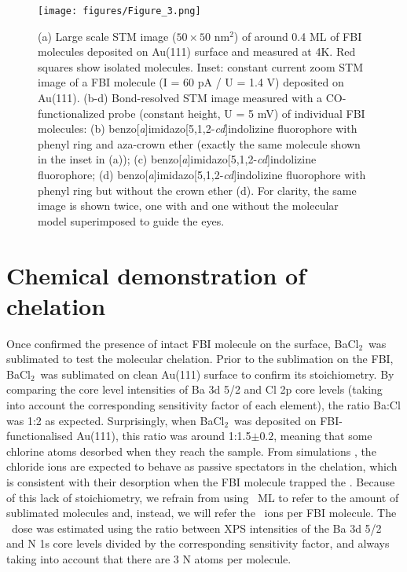 \documentclass[aps,prl,reprint,longbibliography,superscriptaddress, english]{revtex4-1}
\def\BappCl{BaCl$_2$}
\begin{document}
\begin{figure}[ht!]
	\texttt{[image: figures/Figure\_3.png]}
	\caption{\label{FIG_BRSTM} 
    (a) Large scale STM image ($50\times50$ nm$^2$) of around 0.4 ML of FBI molecules deposited on Au(111) surface and measured at 4K. Red squares show isolated molecules. Inset: constant current zoom STM image of a FBI molecule (I = 60 pA / U = 1.4 V) deposited on Au(111). (b-d) Bond-resolved STM image measured with a CO-functionalized probe (constant height, U = 5 mV) of individual FBI molecules: (b) benzo[\textit{a}]imidazo[5,1,2-\textit{cd}]indolizine fluorophore with phenyl ring and aza-crown ether (exactly the same molecule shown in the inset in (a)); (c)  benzo[\textit{a}]imidazo[5,1,2-\textit{cd}]indolizine fluorophore; (d) benzo[\textit{a}]imidazo[5,1,2-\textit{cd}]indolizine fluorophore with phenyl ring but without the crown ether (d). For clarity, the same image is shown twice, one with and one without the molecular model superimposed to guide the eyes.}
\end{figure}

\section{Chemical demonstration of chelation}

Once confirmed the presence of intact FBI molecule on the surface, \BappCl\ was sublimated to test the molecular chelation. Prior to the sublimation on the FBI, \BappCl\ was sublimated on clean Au(111) surface to confirm its stoichiometry. By comparing the core level intensities of Ba 3d 5/2 and Cl 2p core levels (taking into account the corresponding sensitivity factor of each element), the ratio Ba:Cl was 1:2 as expected. Surprisingly, when \BappCl\ was deposited on FBI-functionalised Au(111), this ratio was around 1:1.5$\pm{0.2}$, meaning that some chlorine atoms desorbed when they reach the sample. From simulations \cite{rivilla_fluorescent_2020}, the chloride ions are expected to behave as passive spectators in the chelation, which is consistent with their desorption when the FBI molecule trapped the \Bapp. Because of this lack of stoichiometry, we refrain from using \Bapp\ ML to refer to the amount of sublimated molecules and, instead, we will refer the \Bapp\ ions per FBI molecule. The \Bapp\ dose was estimated using the ratio between XPS intensities of the Ba 3d 5/2 and N 1s core levels divided by the corresponding sensitivity factor, and always taking into account that there are 3 N atoms per molecule.
\end{document}
